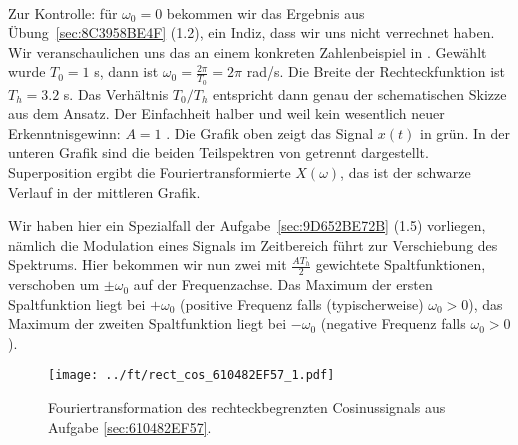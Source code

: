 \begin{ExCalc}
\begin{align}
\end{align}
Zur Kontrolle: für $\omega_0 = 0$ bekommen wir das Ergebnis aus Übung~\ref{sec:8C3958BE4F} (1.2),
%
ein Indiz, dass wir uns nicht verrechnet haben.
%
Wir veranschaulichen uns das an einem konkreten Zahlenbeispiel in
. Gewählt wurde $T_0=1$ s, dann ist
$\omega_0 = \frac{2\pi}{T_0}=2\pi$ rad/s. Die Breite der Rechteckfunktion
ist $T_h=3.2$ s. Das Verhältnis $T_0/T_h$ entspricht dann genau der
schematischen Skizze aus dem Ansatz. Der Einfachheit halber und weil
kein wesentlich neuer Erkenntnisgewinn: $A=1$ .
%
Die Grafik oben zeigt das Signal $x(t)$ in grün.
In der unteren Grafik sind die beiden Teilspektren von 
getrennt dargestellt.
Superposition ergibt die Fouriertransformierte $X(\omega)$, das ist der schwarze
Verlauf in der mittleren Grafik.

Wir haben hier ein Spezialfall der Aufgabe~\ref{sec:9D652BE72B} (1.5) vorliegen, nämlich die Modulation
eines Signals im Zeitbereich führt zur Verschiebung des Spektrums.
Hier bekommen wir nun zwei mit $\frac{A T_h}{2}$ gewichtete Spaltfunktionen,
verschoben um $\pm \omega_0$ auf der Frequenzachse. Das Maximum der ersten Spaltfunktion
liegt bei $+\omega_0$ (positive Frequenz falls (typischerweise) $\omega_0>0$),
das Maximum der zweiten Spaltfunktion liegt bei $-\omega_0$ (negative Frequenz
falls $\omega_0>0$).


\end{ExCalc}
%
\begin{figure}[h]
\centering
  \texttt{[image: ../ft/rect\_cos\_610482EF57\_1.pdf]}
  \caption{Fouriertransformation des rechteckbegrenzten Cosinussignals
  aus Aufgabe \ref{sec:610482EF57}.}
  \label{fig:rect_cos_610482EF57_1}
\end{figure}









